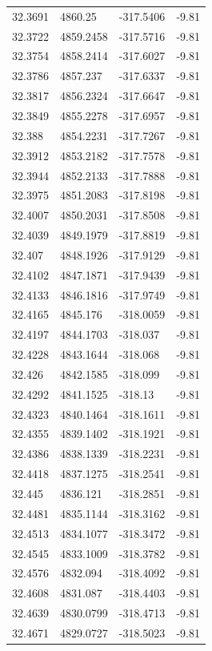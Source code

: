 \begin{table}[H]
\begin{tabular}{llll}
32.3691 & 4860.25 & -317.5406 & -9.81 \\
32.3722 & 4859.2458 & -317.5716 & -9.81 \\
32.3754 & 4858.2414 & -317.6027 & -9.81 \\
32.3786 & 4857.237 & -317.6337 & -9.81 \\
32.3817 & 4856.2324 & -317.6647 & -9.81 \\
32.3849 & 4855.2278 & -317.6957 & -9.81 \\
32.388 & 4854.2231 & -317.7267 & -9.81 \\
32.3912 & 4853.2182 & -317.7578 & -9.81 \\
32.3944 & 4852.2133 & -317.7888 & -9.81 \\
32.3975 & 4851.2083 & -317.8198 & -9.81 \\
32.4007 & 4850.2031 & -317.8508 & -9.81 \\
32.4039 & 4849.1979 & -317.8819 & -9.81 \\
32.407 & 4848.1926 & -317.9129 & -9.81 \\
32.4102 & 4847.1871 & -317.9439 & -9.81 \\
32.4133 & 4846.1816 & -317.9749 & -9.81 \\
32.4165 & 4845.176 & -318.0059 & -9.81 \\
32.4197 & 4844.1703 & -318.037 & -9.81 \\
32.4228 & 4843.1644 & -318.068 & -9.81 \\
32.426 & 4842.1585 & -318.099 & -9.81 \\
32.4292 & 4841.1525 & -318.13 & -9.81 \\
32.4323 & 4840.1464 & -318.1611 & -9.81 \\
32.4355 & 4839.1402 & -318.1921 & -9.81 \\
32.4386 & 4838.1339 & -318.2231 & -9.81 \\
32.4418 & 4837.1275 & -318.2541 & -9.81 \\
32.445 & 4836.121 & -318.2851 & -9.81 \\
32.4481 & 4835.1144 & -318.3162 & -9.81 \\
32.4513 & 4834.1077 & -318.3472 & -9.81 \\
32.4545 & 4833.1009 & -318.3782 & -9.81 \\
32.4576 & 4832.094 & -318.4092 & -9.81 \\
32.4608 & 4831.087 & -318.4403 & -9.81 \\
32.4639 & 4830.0799 & -318.4713 & -9.81 \\
32.4671 & 4829.0727 & -318.5023 & -9.81 \\

\end{tabular}
\end{table}
